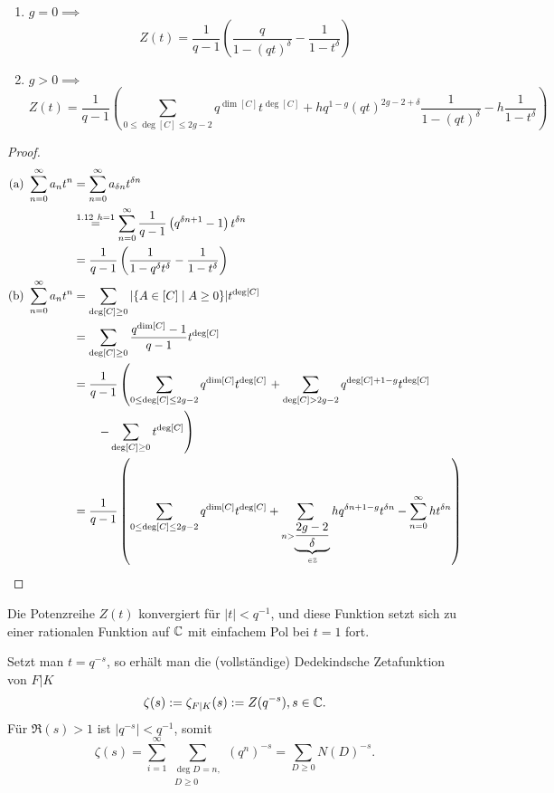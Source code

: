 \begin{satz}
    \begin{enumerate}[label=(\alph*)]
        \item $g=0 \implies$ 
        $$ Z(t) = \frac{1}{q-1}\left(\frac{q}{1-(qt)^\delta} - \frac{1}{1-t^\delta}\right)$$
        \item $g > 0 \implies$
        $$ Z(t) = \frac{1}{q-1}\left(\sum_{0\leq\deg[C]\leq 2g-2}q^{\dim [C]}t^{\deg [C]}+hq^{1-g}(qt)^{2g-2+\delta}\frac{1}{1-(qt)^{\delta}}
        - h\frac{1}{1-t^\delta}
        \right)$$
    \end{enumerate}
\end{satz}
\begin{proof}
    \begin{align*}
        \text{(a) } \sum_{n=0}^\infty a_n t^n & = \sum_{n=0}^\infty a_{\delta n}t^{\delta n}\\
        & \stackrel{1.12~h=1}{=} \sum_{n=0}^\infty \frac{1}{q-1}\left(q^{\delta n +1}-1\right)t^{\delta n}\\
        & = \frac{1}{q-1} \left(\frac{1}{1-q^\delta t^\delta} - \frac{1}{1 - t^\delta}\right)\\
        \text{(b) } \sum_{n=0}^\infty a_n t^n & = \sum_{\deg [C] \geq 0} |\{A \in [C] \mid A \geq 0\}|t^{\deg [C]}\\
        & = \sum_{\deg [C] \geq 0} \frac{q^{\dim [C]}-1}{q-1} t^{\deg [C]}\\
        & = \frac{1}{q-1}\left(\sum_{0 \leq \deg [C] \leq 2g - 2} q^{\dim [C]} t^{\deg [C]}\right.
            + \sum_{\deg [C] > 2g -2} q^{\deg [C] + 1 - g} t^{\deg [C]}\\
            & \left. \qquad - \sum_{\deg [C] \geq 0} t^{\deg [C]}\right)\\
        & = \frac{1}{q-1}\left(\sum_{0 \leq \deg [C] \leq 2g - 2} q^{\dim [C]} t^{\deg [C]} 
            + \sum_{n > \underbrace{\frac{2g -2}{\delta}}_{\in \mathbb{Z}}} hq^{\delta n + 1-g}t^{\delta n}
            - \sum_{n=0}^\infty h t^{\delta n} \right)
    \end{align*}
\end{proof}

\begin{korollar}
    Die Potenzreihe $Z(t)$ konvergiert für $|t| < q^{-1}$, und diese Funktion setzt sich zu einer rationalen Funktion
    auf $\mathbb{C}$ mit einfachem Pol bei $t=1$ fort.
\end{korollar}

\begin{bemerkungnr}
    Setzt man $t = q^{-s}$, so erhält man die (vollständige) Dedekindsche Zetafunktion von $F|K$
    $$ \zeta(s) := \zeta_{F|K}(s) := Z(q^{-s}), s \in \mathbb{C} .$$ 
    Für $\Re(s) > 1$ ist $|q^{-s}| < q^{-1}$, somit 
    $$\zeta(s) = \sum_{i=1}^\infty\sum_{\substack{\deg D=n,\\D\geq 0}} (q^n)^{-s} = \sum_{D\geq 0} N(D)^{-s}.$$ 
\end{bemerkungnr}

